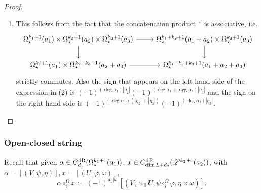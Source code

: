 \documentclass[10pt]{amsart}
\numberwithin{equation}{section}
\theoremstyle{plain}
\theoremstyle{definition}
\theoremstyle{remark}
\numberwithin{equation}{section}
\newcommand{\ms}[1]{\mathscr{#1}}
\newcommand{\dR}{\textup{dR}}
\newcommand{\fiberprod}[2]{\,_{#1}\!\!\times_{#2} }
\begin{document}
{\begin{proof}
\begin{enumerate}
		\item This follows from the fact that the concatenation product $*$ is associative, i.e. 
		\[
\begin{tikzcd}
\Omega^{k_1+1}_\star(a_1)\times \Omega^{k_2+1}_\star (a_2) \times \Omega^{k_3+1}_\star(a_3) \arrow[r] \arrow[d] & \Omega^{k_1+k_2+1}_\star(a_1+a_2)\times \Omega^{k_3+1}_\star(a_3) \arrow[d] \\
\Omega_\star^{k_1+1}(a_1) \times \Omega_\star^{k_2+k_3+1} (a_2+a_3) \arrow[r]                             & \Omega_\star^{k_1+k_2+k_3+1}(a_1+a_2+a_3)                            
\end{tikzcd}
		\]
		strictly commutes.
		Also the sign that appears on the left-hand side of the expression in (2)  is $(-1)^{(\deg\alpha_1)|\eta_2|}(-1)^{(\deg\alpha_1+\deg\alpha_2)|\eta_3|}$ and the sign on the right hand side is $(-1)^{(\deg \alpha_1)(|\eta_2|+|\eta_3|)}(-1)^{(\deg \alpha_2) |\eta_3|}$.
	\end{enumerate}
\end{proof}




\subsubsection{Open-closed string}\label{Subsubsc: OCSignAppendix}
Recall that given $\alpha \in C_{d_1}^\dR(\Omega^{k_1+1}_\star(a_1))$, $x\in C^\dR_{\dim L+d_2}(\ms{L}^{k_2+1}(a_2))$, with $\alpha = [(V,\psi,\eta)], x= [(U,\varphi,\omega)]$, 
\[
	\alpha \circ_i^\Omega x:= (-1)^{d_1|\omega|}[(V\fiberprod{i}{0}U, \psi \circ_i^\Omega \varphi, \eta \times \omega)].
\]


}
\end{document}
